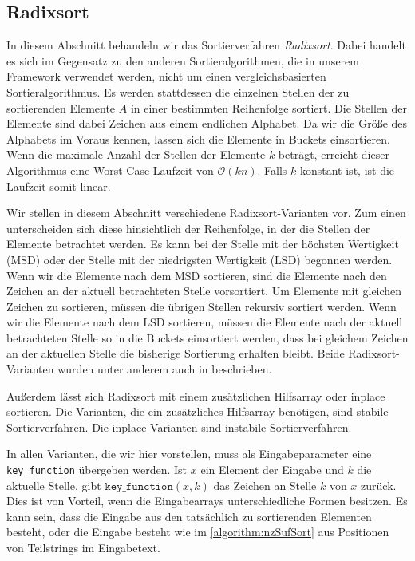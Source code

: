 \subsection{Radixsort}
\label{sort:radix}


In  diesem Abschnitt behandeln wir das Sortierverfahren \emph{Radixsort}.
Dabei handelt es sich im Gegensatz zu den anderen Sortieralgorithmen, die in unserem Framework verwendet werden,
nicht um einen vergleichsbasierten Sortieralgorithmus.
Es werden stattdessen die einzelnen Stellen der zu sortierenden Elemente $A$ in einer bestimmten Reihenfolge sortiert.
Die Stellen der Elemente sind dabei Zeichen aus einem endlichen Alphabet.
Da wir die Größe des Alphabets im Voraus kennen, lassen sich die Elemente in Buckets einsortieren.
Wenn die maximale Anzahl der Stellen der Elemente $k$ beträgt,
erreicht dieser Algorithmus eine Worst-Case Laufzeit von $\mathcal O(kn)$.
Falls $k$ konstant ist, ist die Laufzeit somit linear.

Wir stellen in diesem Abschnitt verschiedene Radixsort-Varianten vor.
Zum einen unterscheiden sich diese hinsichtlich der Reihenfolge,
in der die Stellen der Elemente betrachtet werden.
Es kann bei der Stelle mit der höchsten Wertigkeit (MSD) oder der Stelle mit der niedrigsten Wertigkeit (LSD) begonnen werden.
Wenn wir die Elemente nach dem MSD sortieren, sind die Elemente nach den Zeichen an der aktuell betrachteten Stelle vorsortiert.
Um Elemente mit gleichen Zeichen zu sortieren, müssen die übrigen Stellen rekursiv sortiert werden.
Wenn wir die Elemente nach dem LSD sortieren,
müssen die Elemente nach der aktuell betrachteten Stelle so in die Buckets einsortiert werden,
dass bei gleichem Zeichen an der aktuellen Stelle die bisherige Sortierung erhalten bleibt.
Beide Radixsort-Varianten wurden unter anderem auch in \cite{Cormen2009} beschrieben.

Außerdem lässt sich Radixsort mit einem zusätzlichen Hilfsarray oder inplace sortieren.
Die Varianten, die ein zusätzliches Hilfsarray benötigen, sind stabile Sortierverfahren.
Die inplace Varianten sind instabile Sortierverfahren.

In allen Varianten, die wir hier vorstellen,
muss als Eingabeparameter eine \texttt{key\_function} übergeben werden.
Ist $x$ ein Element der Eingabe und $k$ die aktuelle Stelle, gibt $\texttt{key\_function}(x,k)$ das Zeichen an Stelle $k$ von $x$ zurück.
Dies ist von Vorteil, wenn die Eingabearrays unterschiedliche Formen besitzen.
Es kann sein, dass die Eingabe aus den tatsächlich zu sortierenden Elementen besteht,
oder die Eingabe besteht wie im \cref{algorithm:nzSufSort} aus Positionen von Teilstrings im Eingabetext.


